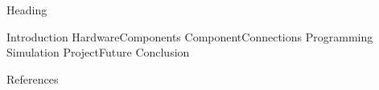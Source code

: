 \documentclass[conference]{IEEEtran}
\begin{document}
{Heading}

{Introduction}
{HardwareComponents}
{ComponentConnections}
{Programming}
{Simulation}
{ProjectFuture}
{Conclusion}

{References}
\end{document}
